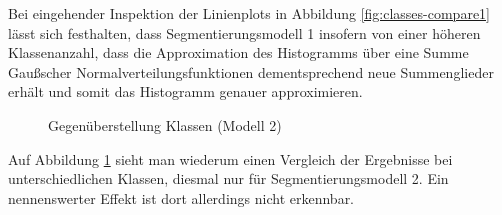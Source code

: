 			Bei eingehender Inspektion der Linienplots in Abbildung \ref{fig:classes-compare1} lässt sich festhalten, dass Segmentierungsmodell 1 insofern von einer höheren Klassenanzahl, dass die Approximation des Histogramms über eine Summe Gaußscher Normalverteilungsfunktionen dementsprechend neue Summenglieder erhält und somit das Histogramm genauer approximieren.
			\begin{figure}[H]
				\centering
				
				\caption{Gegenüberstellung Klassen (Modell 2) }
				\label{fig:classes-compare2}
			\end{figure}
			Auf Abbildung \ref{fig:classes-compare2} sieht man wiederum einen Vergleich der Ergebnisse bei unterschiedlichen Klassen, diesmal nur für Segmentierungsmodell 2. Ein nennenswerter Effekt ist dort allerdings nicht erkennbar.
			
